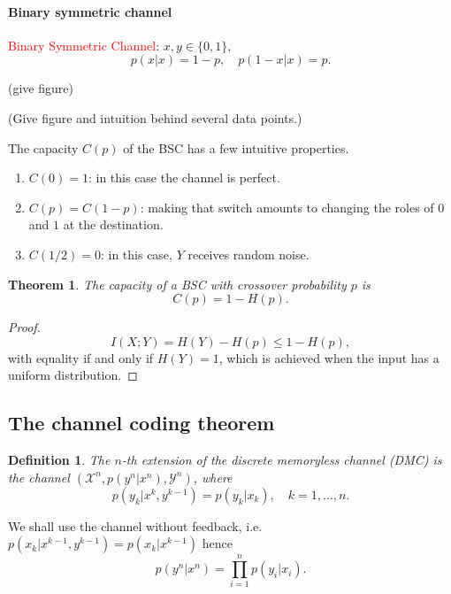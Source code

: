 \documentclass[a4paper, 11pt, openany]{book}
\numberwithin{equation}{section}
\theoremstyle{plain}
\newtheorem{theorem}	[equation]	{Theorem}
\newtheorem{definition}	[equation]	{Definition}
\theoremstyle{definition}
\newcommand{\Important}[1]{\textcolor{red}{#1}}
\newcommand{\alphabet}[1]{\mathcal{#1}}
\begin{document}
\paragraph{Binary symmetric channel}

\Important{Binary Symmetric Channel}: $x, y \in \{0,1\}$, 
$$
	p(x|x) = 1-p, \quad p(1- x|x) = p.
$$

(give figure)


(Give figure and intuition behind several data points.)

The capacity $C(p)$ of the BSC has a few intuitive properties.
\begin{enumerate}
    \item $C(0) = 1$: in this case the channel is perfect.
    
    \item $C(p) = C(1-p)$: making that switch amounts to changing the roles of $0$ and $1$ at the destination.
    
    \item $C(1/2) = 0$: in this case, $Y$ receives random noise.
\end{enumerate}

\begin{theorem}
The capacity of a BSC with crossover probability $p$ is
\[
	C(p) = 1 - H(p).
\]
\end{theorem}


\begin{proof}
$$
	I(X;Y) = H(Y) - H(p) \le 1 - H(p),
$$
with equality if and only if $H(Y) = 1$, which is achieved when the input has a uniform distribution. 
\end{proof}



\subsection{The channel coding theorem}



\begin{definition}
The $n$-th extension of the discrete memoryless channel (DMC) is the channel $(\alphabet{X}^n, p(y^n | x^n), \alphabet{Y}^n)$, where
$$
	p(y_k | x^k, y^{k-1}) = p(y_k | x_k), \quad k=1,\ldots,n.
$$
\end{definition}

We shall use the channel without feedback, i.e. $p(x_k | x^{k-1}, y^{k-1}) = p(x_k | x^{k-1})$ hence
$$
	p(y^n | x^n) = \prod_{i=1}^n p(y_i | x_i).
$$
\end{document}
